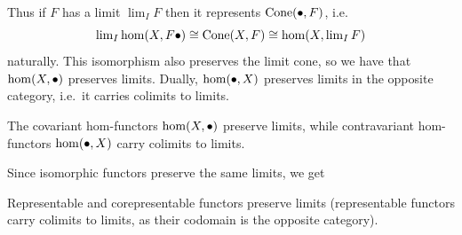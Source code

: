 Thus if $F$ has a limit $\lim_IF$ then it represents ${\rm Cone}(\bullet,F)$, i.e.\ 
$$ \mathop{\rm lim}\nolimits_I\hom(X,F\bullet) \cong {\rm Cone}(X,F) \cong \hom(X,\mathop{\rm lim}\nolimits_IF) $$
naturally.
This isomorphism also preserves the limit cone, so we have that $\hom(X,\bullet)$ preserves limits.
Dually, $\hom(\bullet,X)$ preserves limits in the opposite category, i.e.\ it carries colimits to limits.

\bprop

    The covariant hom-functors $\hom(X,\bullet)$ preserve limits, while contravariant hom-functors $\hom(\bullet,X)$ carry colimits to limits.

\eprop

Since isomorphic functors preserve the same limits, we get

\bprop

    Representable and corepresentable functors preserve limits (representable functors carry colimits to limits, as their codomain is the opposite category).

\eprop

